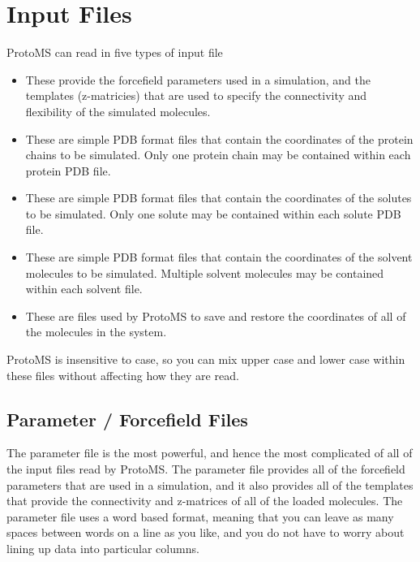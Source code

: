 \documentclass[letterpaper,10pt,english]{sphinxmanual}
\begin{document}
\chapter{Input Files}
\label{\detokenize{protoms:input-files}}
ProtoMS can read in five types of input file
\begin{itemize}
\item {} 
 These provide the forcefield parameters used in a simulation, and the templates (z-matricies) that are used to specify the connectivity and flexibility of the simulated molecules.

\item {} 
 These are simple PDB format files that contain the coordinates of the protein chains to be simulated. Only one protein chain may be contained within each protein PDB file.

\item {} 
 These are simple PDB format files that contain the coordinates of the solutes to be simulated. Only one solute may be contained within each solute PDB file.

\item {} 
 These are simple PDB format files that contain the coordinates of the solvent molecules to be simulated. Multiple solvent molecules may be contained within each solvent file.

\item {} 
 These are files used by ProtoMS to save and restore the coordinates of all of the molecules in the system.

\end{itemize}

ProtoMS is insensitive to case, so you can mix upper case and lower case within these files without affecting how
they are read.


\section{Parameter / Forcefield Files}
\label{\detokenize{protoms:parameter-forcefield-files}}\label{\detokenize{protoms:parfil}}
The parameter file is the most powerful, and hence the most complicated of all of the input files read by ProtoMS. The parameter file provides all of the forcefield parameters that are used in a simulation, and it also provides all of the templates that provide the connectivity and z-matrices of all of the loaded molecules. The parameter file uses a word based format, meaning that you can leave as many spaces between words on a line as you like, and you do not have to worry about lining up data into particular columns.
\end{document}
